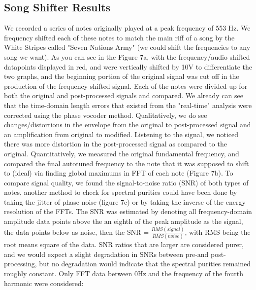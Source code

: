 \documentclass{article}
\begin{document}
    \subsection{Song Shifter Results}
    We recorded a series of notes originally played at a peak frequency of 553 Hz. We frequency shifted each of these notes to match the main riff of a song by the White Stripes called "Seven Nations Army" (we could shift the frequencies to any song we want). As you can see in the Figure 7a, with the frequency/audio shifted datapoints displayed in red, and were vertically shifted by 10V to differentiate the two graphs, and the beginning portion of the original signal was cut off in the production of the frequency shifted signal. Each of the notes were divided up for both the original and post-processed signals and compared. We already can see that the time-domain length errors that existed from the "real-time" analysis were corrected using the phase vocoder method. Qualitatively, we do see changes/distortions in the envelope from the original to post-processed signal and an amplification from original to modified. Listening to the signal, we noticed there was more distortion in the post-processed signal as compared to the original. Quantitatively, we measured the original fundamental frequency, and compared the final autotuned frequency to the note that it was supposed to shift to (ideal) via finding global maximums in FFT of each note (Figure 7b). To compare signal quality, we found the signal-to-noise ratio (SNR) of both types of notes, another method to check for spectral purities could have been done by taking the jitter of phase noise (figure 7c) or by taking the inverse of the energy resolution of the FFTs. The SNR was estimated by denoting all frequency-domain amplitude data points above the an eighth of the peak amplitude as the signal, the data points below as noise, then the SNR = $\frac{RMS(signal)}{RMS(noise)}$, with RMS being the root means square of the data. SNR ratios that are larger are considered purer, and we would expect a slight degradation in SNRs between pre-and post-processing, but no degradation would indicate that the spectral purities remained roughly constant. Only FFT data between 0Hz and the frequency of the fourth harmonic were considered:
\end{document}
